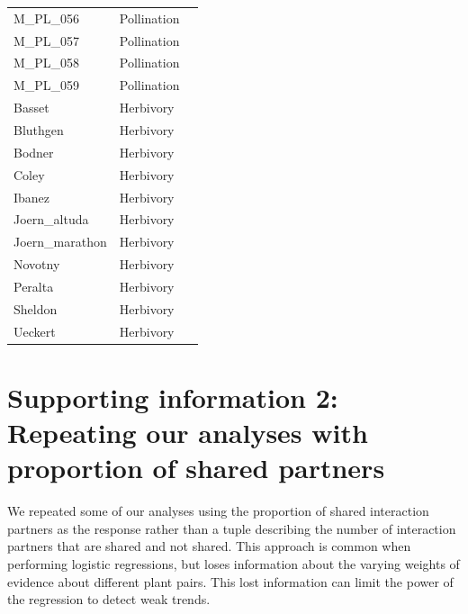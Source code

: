 \documentclass[12pt]{article}
\begin{document}
\begin{spacing}{1.0}
\begin{table}[h!]
\begin{center}
\begin{tabular}{|l l m{6cm} |}
    M\_PL\_056  & Pollination & \citep{Kato1993}  \\
    M\_PL\_057  & Pollination & \citep{Inoue1990} \\
    M\_PL\_058  & Pollination & \citep{Bartomeus2008} \\
    M\_PL\_059  & Pollination & \citep{Bezerra2009} \\
    Basset  & Herbivory & \citep{Basset1996}  \\
    Bluthgen  & Herbivory & \citep{Bluthgen2006}  \\
    Bodner  & Herbivory & \citep{Bodner2010}  \\
    Coley & Herbivory & \citep{Coley2006} \\
    Ibanez  & Herbivory & \citep{Ibanez2013}  \\
    Joern\_altuda  & Herbivory & \citep{Joern1979} \\
    Joern\_marathon  & Herbivory & \citep{Joern1979} \\
    Novotny & Herbivory & \citep{Novotny2012} \\
    Peralta & Herbivory & \citep{Peralta2016} \\
    Sheldon & Herbivory & \citep{Sheldon1978} \\
    Ueckert & Herbivory & \citep{Ueckert1971} \\
    \hline
    \end{tabular}
    \end{center}
    \end{table}
\clearpage
\newpage

\section*{Supporting information 2: Repeating our analyses with proportion of shared partners}

    We repeated some of our analyses using the proportion of shared interaction partners as the response rather than a tuple describing the number of interaction partners that are shared and not shared. This approach is common when performing logistic regressions, but loses information about the varying weights of evidence about different plant pairs. This lost information can limit the power of the regression to detect weak trends.



\end{spacing}
\end{document}
